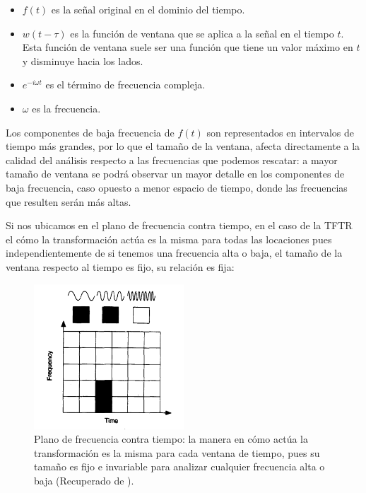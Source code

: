 \begin{itemize}
  \item \( f(t) \) es la señal original en el dominio del tiempo.
  \item \( w(t - \tau) \) es la función de ventana que se aplica a la señal en el tiempo \( t \). Esta función de ventana suele ser una función que tiene un valor máximo en \( t \) y disminuye hacia los lados.
  \item \( e^{-i\omega t} \) es el término de frecuencia compleja.
  \item \( \omega \) es la frecuencia.
\end{itemize}

Los componentes de baja frecuencia de $f(t)$ son representados en intervalos de tiempo más grandes, por lo que el tamaño de la ventana, afecta directamente a la calidad del análisis respecto a las frecuencias que podemos rescatar: a mayor tamaño de ventana se podrá observar un mayor detalle en los componentes de baja frecuencia, caso opuesto a menor espacio de tiempo, donde las frecuencias que resulten serán más altas.

Si nos ubicamos en el plano de frecuencia contra tiempo, en el caso de la TFTR el cómo la transformación actúa es la misma para todas las locaciones pues independientemente de si tenemos una frecuencia alta o baja, el tamaño de la ventana respecto al tiempo es fijo, su relación es fija:

\begin{figure}[ht]
    \centering
    \includegraphics[width=0.5\textwidth]{Figuras/descomposicion/tiempo_frecuencia_TFTR.png}
    \caption{Plano de frecuencia contra tiempo: la manera en cómo actúa la transformación es la misma para cada ventana de tiempo, pues su tamaño es fijo e invariable para analizar cualquier frecuencia alta o baja (Recuperado de \cite{an_introduction_to_wavelets}).} 
    \label{fig:tiempo_frecuencia_TFTR}
\end{figure}

